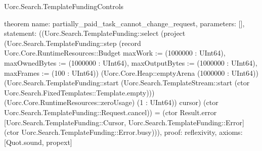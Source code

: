\begin{lexlean}{Uorc.Search.TemplateFundingControls}
\begin{semanticmodule}
theorem{
  name: partially_paid_task_cannot_change_request,
  parameters: [],
  statement: ((Uorc.Search.TemplateFunding::select (project (Uorc.Search.TemplateFunding::step (record Uorc.Core.RuntimeResources::Budget {maxWork := (1000000 : UInt64), maxOwnedBytes := (1000000 : UInt64), maxOutputBytes := (1000000 : UInt64), maxFrames := (100 : UInt64)}) (Uorc.Core.Heap::emptyArena (1000000 : UInt64)) (Uorc.Search.TemplateFunding::start (Uorc.Search.TemplateStream::start (ctor Uorc.Search.FixedTemplates::Template.empty))) (Uorc.Core.RuntimeResources::zeroUsage) (1 : UInt64)) cursor) (ctor Uorc.Search.TemplateFunding::Request.cancel)) = (ctor Result.error [Uorc.Search.TemplateFunding::Cursor, Uorc.Search.TemplateFunding::Error] (ctor Uorc.Search.TemplateFunding::Error.busy))),
  proof: reflexivity{},
  axioms: [Quot.sound, propext]
}


\end{semanticmodule}
\end{lexlean}

